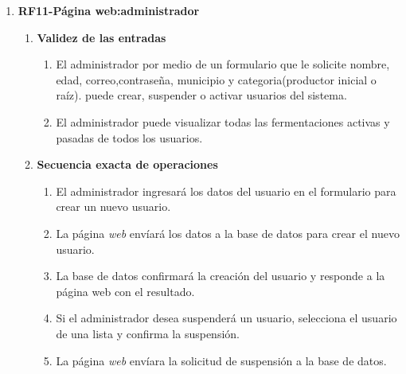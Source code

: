 \begin{enumerate}
\begin{enumerate}
                \item \textbf{Relación entre las salidas y las entradas}
                    \begin{enumerate}
                        \item Los gráficos y tablas deben mostrarán los datos históricos de pH, temperatura y CO2 de las fermentaciones pasadas segun lo solicite el usuario.
                    \end{enumerate}
        \end{enumerate}

        \item \label{it:RF11} \textbf{RF11-Página web:administrador}
        \begin{enumerate}
                \item \textbf{Validez de las entradas}
                    \begin{enumerate}
                        \item El administrador por medio de un formulario que le solicite nombre,
                        edad, correo,contraseña, municipio y categoria(productor inicial o raíz). 
                        puede crear, suspender o activar usuarios del sistema.
                        \item El administrador puede visualizar todas las fermentaciones activas y pasadas de todos los usuarios.
                    \end{enumerate}   
                
                \item \textbf{Secuencia exacta de operaciones}
                    \begin{enumerate}
                        \item El administrador ingresará los datos del usuario en el formulario para crear un nuevo usuario.
                        \item La página \textit{web} envíará los datos a la base de datos para crear el nuevo usuario.
                        \item La base de datos confirmará la creación del usuario y responde a la página web con el resultado.
                        \item Si el administrador desea suspenderá un usuario, selecciona el usuario
                        de una lista y confirma la suspensión.
                        \item La página \textit{web} envíara la solicitud de suspensión a la base de datos.
                    \end{enumerate}   
            

\end{enumerate}
\end{enumerate}
